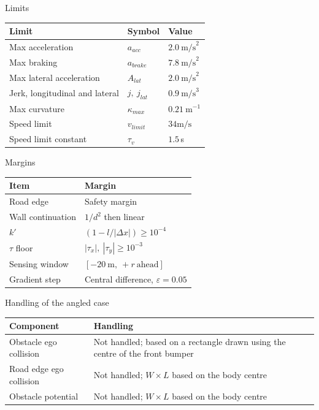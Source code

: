 \documentclass[aspectratio=169,11pt]{beamer}
\begin{document}
\begin{frame}{Limits}
  \centering
  \small
  \renewcommand{\arraystretch}{1.3}
  \begin{tabular}{lll}
    \toprule
    \textbf{Limit} & \textbf{Symbol} & \textbf{Value} \\
    \midrule
    Max acceleration               & $a_{acc}$     & $2.0\ \text{m/s}^2$ \\
    Max braking                    & $a_{brake}$   & $7.8\ \text{m/s}^2$ \\
    Max lateral acceleration       & $A_{lat}$     & $2.0\ \text{m/s}^2$ \\
    Jerk, longitudinal and lateral & $j,\ j_{lat}$ & $0.9\ \text{m/s}^3$ \\
    Max curvature                  & $\kappa_{max}$ &$0.21\ \text{m}^{-1}$  \\
    Speed limit                    & $v_{limit}$   & $34\text{m/s}$ \\
    Speed limit constant                 & $\tau_v$      & $1.5$\,s \\
    \bottomrule
  \end{tabular}
\end{frame}

\begin{frame}{Margins}
  \centering
  \renewcommand{\arraystretch}{1.3}
  \begin{tabular}{ll}
    \toprule
    \textbf{Item} & \textbf{Margin} \\
    \midrule
    Road edge         & Safety margin  \\
    Wall continuation & $1/d^2$ then linear \\
    $k'$              & $\left(1 - l/|\Delta x|\right) \ge 10^{-4}$ \\
    $\tau$ floor      & $|\tau_x|,\ |\tau_y| \ge 10^{-3}$ \\
    Sensing window    & $[-20\ \text{m},\ +r\ \text{ahead}]$ \\
    Gradient step     & Central difference, $\varepsilon = 0.05$ \\
    \bottomrule
  \end{tabular}
\end{frame}

\begin{frame}{Handling of the angled case}
  \centering
  \renewcommand{\arraystretch}{1.4}
  \begin{tabular}{lp{}}
    \toprule
    \textbf{Component} & \textbf{Handling} \\
    \midrule
    Obstacle ego collision  & Not handled; based on a rectangle drawn using
                               the centre of the front bumper \\
    Road edge ego collision & Not handled; $W \times L$ based on the body centre \\
    Obstacle potential       & Not handled; $W \times L$ based on the body centre \\
    \bottomrule
  \end{tabular}
  
\end{frame}
\end{document}
